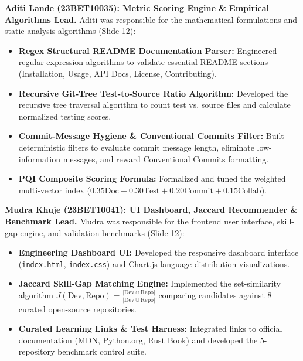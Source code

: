 \documentclass[12pt,a4paper]{article}
\begin{document}
\newpage
\thispagestyle{fancy}
\noindent \textbf{Aditi Lande (23BET10035): Metric Scoring Engine \& Empirical Algorithms Lead.} Aditi was responsible for the mathematical formulations and static analysis algorithms (Slide 12):
\begin{itemize}
    \item \textbf{Regex Structural README Documentation Parser:} Engineered regular expression algorithms to validate essential README sections (Installation, Usage, API Docs, License, Contributing).
    \item \textbf{Recursive Git-Tree Test-to-Source Ratio Algorithm:} Developed the recursive tree traversal algorithm to count test vs. source files and calculate normalized testing scores.
    \item \textbf{Commit-Message Hygiene \& Conventional Commits Filter:} Built deterministic filters to evaluate commit message length, eliminate low-information messages, and reward Conventional Commits formatting.
    \item \textbf{PQI Composite Scoring Formula:} Formalized and tuned the weighted multi-vector index ($0.35 \text{Doc} + 0.30 \text{Test} + 0.20 \text{Commit} + 0.15 \text{Collab}$).
\end{itemize}

\vspace{0.4cm}
\noindent \textbf{Mudra Khuje (23BET10041): UI Dashboard, Jaccard Recommender \& Benchmark Lead.} Mudra was responsible for the frontend user interface, skill-gap engine, and validation benchmarks (Slide 12):
\begin{itemize}
    \item \textbf{Engineering Dashboard UI:} Developed the responsive dashboard interface (\texttt{index.html}, \texttt{index.css}) and Chart.js language distribution visualizations.
    \item \textbf{Jaccard Skill-Gap Matching Engine:} Implemented the set-similarity algorithm $J(\text{Dev}, \text{Repo}) = \frac{|\text{Dev} \cap \text{Repo}|}{|\text{Dev} \cup \text{Repo}|}$ comparing candidates against 8 curated open-source repositories.
    \item \textbf{Curated Learning Links \& Test Harness:} Integrated links to official documentation (MDN, Python.org, Rust Book) and developed the 5-repository benchmark control suite.
\end{itemize}
\end{document}
